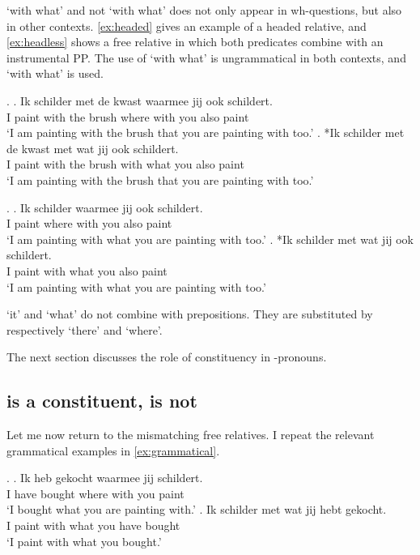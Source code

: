 \documentclass[12pt]{article}
\begin{document}
 `with what' and not  `with what' does not only appear in wh-questions, but also in other contexts. \ref{ex:headed} gives an example of a headed relative, and \ref{ex:headless} shows a free relative in which both predicates combine with an instrumental PP. The use of  `with what' is ungrammatical in both contexts, and  `with what' is used.

\ex.\label{ex:headed}
\ag. Ik schilder met de kwast waarmee jij ook schildert.\\
 I paint with the brush {where with} you also paint\\
 `I am painting with the brush that you are painting with too.'
\bg. *Ik schilder met de kwast met wat jij ook schildert.\\
 I paint with the brush with what you also paint\\
 `I am painting with the brush that you are painting with too.'

 \ex.\label{ex:headless}
 \ag. Ik schilder waarmee jij ook schildert.\\
  I paint {where with} you also paint\\
  `I am painting with what you are painting with too.'
 \bg. *Ik schilder met wat jij ook schildert.\\
  I paint with what you also paint\\
  `I am painting with what you are painting with too.'

 `it' and  `what' do not combine with prepositions. They are substituted by respectively  `there' and  `where'.

The next section discusses the role of constituency in -pronouns.


\subsection{ is a constituent,  is not}

Let me now return to the mismatching free relatives. I repeat the relevant grammatical examples in \ref{ex:grammatical}.

\ex.\label{ex:grammatical}
\ag. Ik heb gekocht waarmee jij schildert.\\
 I have bought {where with} you paint\\
 `I bought what you are painting with.'\label{ex:grammaticalwaar}
\bg. Ik schilder met wat jij hebt gekocht.\\
 I paint with what you have bought\\
 `I paint with what you bought.'\label{ex:grammaticalwat}
\end{document}
